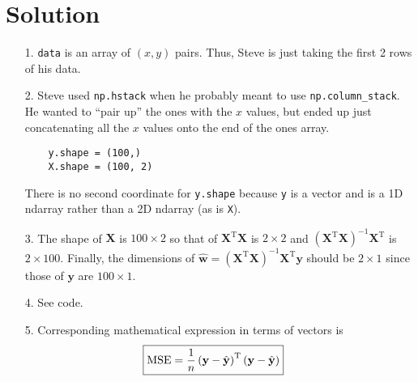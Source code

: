 \documentclass{harvardml}
\theoremstyle{definition}
\theoremstyle{plain}
\newenvironment{solution}
  {\color{blue}\section*{Solution}}
{}
\begin{document}
\begin{solution}

\begin{enumerate}
    \item [1.] \texttt{data} is an array of $(x,y)$ pairs. Thus, Steve is just taking the first 2 rows of his data.
    \item[2.] Steve used \texttt{np.hstack} when he probably meant to use \texttt{np.column\_stack}. He wanted to ``pair up'' the ones with the $x$ values, but ended up just concatenating all the $x$ values onto the end of the ones array.
    \begin{verbatim}
    y.shape = (100,)
    X.shape = (100, 2)
    \end{verbatim} 
    There is no second coordinate for \texttt{y.shape} because \texttt{y} is a vector and is a 1D ndarray rather than a 2D ndarray (as is \texttt{X}).

    \item[3.] The shape of $\mathbf{X}$ is $100 \times 2$ so that of $\mathbf{X}^\mathrm{T}\mathbf{X}$ is $2 \times 2$ and $(\mathbf{X}^\mathrm{T}\mathbf{X})^{-1} \mathbf{X}^\mathrm{T}$ is $2 \times 100$. Finally, the dimensions of $\hat{\mathbf{w}} = (\mathbf{X}^\mathrm{T}\mathbf{X})^{-1} \mathbf{X}^\mathrm{T}\mathbf{y}$ should be $\boxed{2 \times 1}$ since those of $\mathbf{y}$ are $100 \times 1$.

    \item[4.] See code.

    \item[5.] Corresponding mathematical expression in terms of vectors is
    \begin{align*}
        \Aboxed{ \text{MSE} &= \frac{1}{n} \left(\mathbf{y}-\hat{\mathbf{y}}\right)^\mathrm{T}\left(\mathbf{y}-\hat{\mathbf{y}}\right) }
    \end{align*}
\end{enumerate}

\end{solution}
\end{document}
